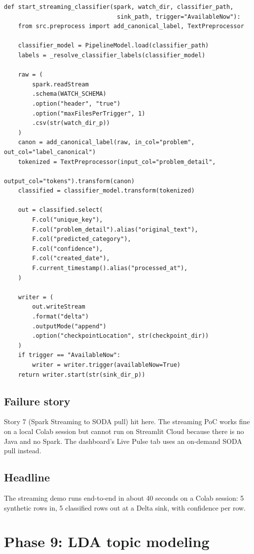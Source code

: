 \documentclass[11pt,letterpaper]{book}
\begin{document}
\begin{lstlisting}
def start_streaming_classifier(spark, watch_dir, classifier_path,
                                sink_path, trigger="AvailableNow"):
    from src.preprocess import add_canonical_label, TextPreprocessor

    classifier_model = PipelineModel.load(classifier_path)
    labels = _resolve_classifier_labels(classifier_model)

    raw = (
        spark.readStream
        .schema(WATCH_SCHEMA)
        .option("header", "true")
        .option("maxFilesPerTrigger", 1)
        .csv(str(watch_dir_p))
    )
    canon = add_canonical_label(raw, in_col="problem", out_col="label_canonical")
    tokenized = TextPreprocessor(input_col="problem_detail",
                                  output_col="tokens").transform(canon)
    classified = classifier_model.transform(tokenized)

    out = classified.select(
        F.col("unique_key"),
        F.col("problem_detail").alias("original_text"),
        F.col("predicted_category"),
        F.col("confidence"),
        F.col("created_date"),
        F.current_timestamp().alias("processed_at"),
    )

    writer = (
        out.writeStream
        .format("delta")
        .outputMode("append")
        .option("checkpointLocation", str(checkpoint_dir))
    )
    if trigger == "AvailableNow":
        writer = writer.trigger(availableNow=True)
    return writer.start(str(sink_dir_p))
\end{lstlisting}

\subsection*{Failure story}

Story 7 (Spark Streaming to SODA pull) hit here. The streaming PoC works fine on a local Colab session but cannot run on Streamlit Cloud because there is no Java and no Spark. The dashboard's Live Pulse tab uses an on-demand SODA pull instead.

\subsection*{Headline}

The streaming demo runs end-to-end in about 40 seconds on a Colab session: 5 synthetic rows in, 5 classified rows out at a Delta sink, with confidence per row.

\section{Phase 9: LDA topic modeling}
\label{sec:phase9}
\end{document}
